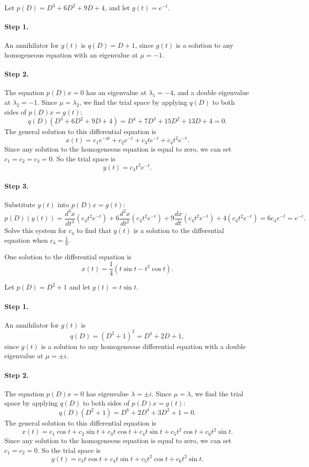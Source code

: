 \soln Let $p(D) = D^3 + 6D^2 + 9D + 4$, and let $g(t) = e^{-t}$.
\paragraph{Step 1.} An annihilator for $g(t)$ is $q(D) = D + 1$, since
$g(t)$ is a solution to any homogeneous equation with an eigenvalue at
$\mu = -1$.

\paragraph{Step 2.} The equation $p(D)x = 0$ has an eigenvalue at
$\lambda_1 = -4$, and a double eigenvalue at $\lambda_2 = -1$.  Since
$\mu = \lambda_2$, we find the trial space by applying $q(D)$ to both
sides of $p(D)x = g(t)$:
\[
q(D)(D^3 + 6D^2 + 9D + 4) = D^4 + 7D^3 + 15D^2 + 13D + 4 = 0.
\]
The general solution to this differential equation is
\[
x(t) = c_1e^{-4t} + c_2e^{-t} + c_3te^{-t} + c_4t^2e^{-t}.
\]
Since any solution to the homogeneous equation is equal to zero, we can set
$c_1 = c_2 = c_3 = 0$.  So the trial space is
\[
y(t) = c_4t^2e^{-t}.
\]
\paragraph{Step 3.} Substitute $y(t)$ into $p(D)x = g(t)$:
\[
p(D)(y(t)) = \frac{d^3x}{dt^3}(c_4t^2e^{-t}) +
6\frac{d^2x}{dt^2}(c_4t^2e^{-t}) + 9\frac{dx}{dt}(c_4t^2e^{-t}) +
4(c_4t^2e^{-t}) = 6c_4e^{-t} =  e^{-t}.
\]
Solve this system for $c_4$ to find that $y(t)$ is a solution to the
differential equation when $c_4 = \frac{1}{6}$.

 \ans One solution to the differential equation is
\[
x(t) = \frac{1}{4}(t\sin t- t^2\cos t).
\]

\soln Let $p(D) = D^2 + 1$ and let $g(t) = t\sin t$.
\paragraph{Step 1.} An annihilator for $g(t)$ is
\[
q(D) = (D^2 + 1)^2 = D^4 + 2D + 1,
\]
since $g(t)$ is a solution to any homogeneous differential equation
with a double eigenvalue at $\mu = \pm i$.

\paragraph{Step 2.} The equation $p(D)x = 0$ has eigenvalue $\lambda =
\pm i$.  Since $\mu = \lambda$, we find the trial space by applying
$q(D)$ to both sides of $p(D)x = g(t)$:
\[
q(D)(D^2 + 1) = D^6 + 2D^4 + 3D^2 + 1 = 0.
\]
The general solution to this differential equation is
\[
x(t) = c_1\cos t + c_2\sin t + c_3t\cos t + c_4t\sin t + c_5t^2\cos t
+ c_6t^2\sin t.
\]
Since any solution to the homogeneous equation is equal to zero, we can
set $c_1 = c_2 = 0$.  So the trial space is
\[
y(t) = c_3t\cos t + c_4t\sin t + c_5t^2\cos t + c_6t^2\sin t.
\]
